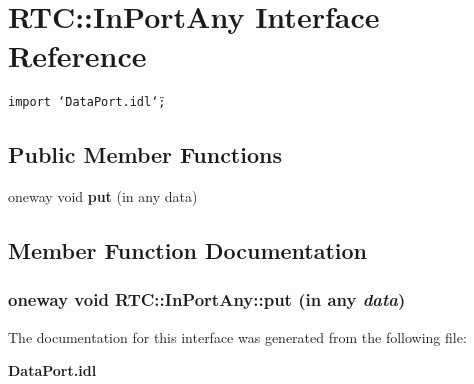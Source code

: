 \section{RTC::In\-Port\-Any Interface Reference}
\label{interfaceRTC_1_1InPortAny}
{\tt import \char`\"{}Data\-Port.idl\char`\"{};}

\subsection*{Public Member Functions}
\begin{CompactItemize}
\item 
oneway void {\bf put} (in any data)
\end{CompactItemize}


\subsection{Member Function Documentation}
\subsubsection{\setlength{\rightskip}{0pt plus 5cm}oneway void RTC::In\-Port\-Any::put (in any {\em data})}\label{interfaceRTC_1_1InPortAny_RTC_1_1InPortAnya0}




The documentation for this interface was generated from the following file:\begin{CompactItemize}
\item 
{\bf Data\-Port.idl}\end{CompactItemize}
